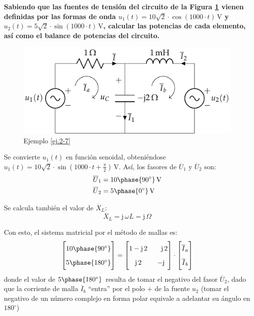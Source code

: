 \vspace{4mm}
\begin{example}\label{ej.2-7}
  \textbf{Sabiendo que las fuentes de tensión del circuito de la
    Figura \ref{fig:problema9_garri} vienen definidas por las formas
    de onda $u_1(t)=10\sqrt{2}\cdot \cos(1000\cdot t) \,\si{\volt}$ y
    $u_2(t)=5\sqrt{2}\cdot \sin(1000\cdot t) \,\si{\volt}$, calcular
    las potencias de cada elemento, así como el balance de potencias
    del circuito. }
  \begin{figure}[H]
    \centering
    \includegraphics[width=0.6\linewidth]{../figs/ej7_BT2.pdf}
    \caption{Ejemplo \ref{ej.2-7}}
    \label{fig:problema9_garri}
  \end{figure}
		
  Se convierte $u_1(t)$ en función senoidal, obteniéndose
  $u_1(t)=10\sqrt{2}\cdot \sin(1000\cdot t+\frac{\pi}{2})
  \,\si{\volt}$. Así, los fasores de $\overline{U}_1$ y
  $\overline{U}_2$ son:
  \begin{align*}
    \overline{U}_1&=10\phase{90^\circ}\,\si{\volt}\\
    \overline{U}_2&=5\phase{0^\circ}\,\si{\volt}
  \end{align*}
		
  Se calcula también el valor de $\overline{X}_L$:
  \begin{equation*}
    \overline{X}_L=\mathrm{j}\,\omega L=\mathrm{j}\,\Omega
  \end{equation*}
		
  Con esto, el sistema matricial por el método de mallas es:
  \begin{equation*}
    \begin{bmatrix}
      \vphantom{\dfrac{1}{1}}10\phase{90^\circ} \\[4pt]
      \vphantom{\dfrac{1}{1}}5\phase{180^\circ} 
    \end{bmatrix}
    =
    \begin{bmatrix}
      \vphantom{\dfrac{1}{1}}1-\mathrm{j}\,2 & \quad\mathrm{j}\,2 \\[4pt]
      \vphantom{\dfrac{1}{1}}\mathrm{j}\,2 & -\mathrm{j} \\
    \end{bmatrix}
    \cdot 
    \begin{bmatrix}
      \vphantom{\dfrac{1}{1}}\overline{I}_a\\[4pt]
      \vphantom{\dfrac{1}{1}}\overline{I}_b
    \end{bmatrix}
  \end{equation*}          
  donde el valor de $5\phase{\ang{180}}$ resulta de tomar el negativo
  del fasor $\overline{U}_2$, dado que la corriente de malla
  $\overline{I}_b$ ``entra'' por el polo $+$ de la fuente $u_2$ (tomar
  el negativo de un número complejo en forma polar equivale a
  adelantar su ángulo en $180^\circ$)


\end{example}
